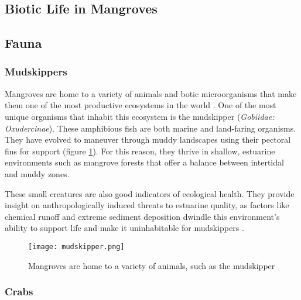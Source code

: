 

\subsection{Biotic Life in Mangroves}

\subsection{Fauna} 

\subsubsection{Mudskippers}

Mangroves are home to a variety of animals and botic microorganisms that make them one of the most productive ecosystems in the world \citep{kristensen1991benthic}. One of the most unique organisms that inhabit this ecosystem is the mudskipper (\textit{Gobiidae: Oxudercinae}). These amphibious fish are both marine and land-faring organisms. They have evolved to maneuver through muddy landscapes using their pectoral fins for support  (figure \ref{fig:mudskipper}). For this reason, they thrive in shallow, estuarine environments such as mangrove forests that offer a balance between intertidal and muddy zones. 
	
These small creatures are also good indicators of ecological health. They provide insight on anthropologically induced threats to estuarine quality, as factors like chemical runoff and extreme sediment deposition dwindle this environment's ability to support life and make it uninhabitable for mudskippers \citep{polgar2009species}. 

  
  \begin{figure}[!h]
    \centering
    \texttt{[image: mudskipper.png]}
    \caption {Mangroves are home to a variety of animals, such as the mudskipper}
    \label{fig:mudskipper}
\end{figure}


\subsubsection{Crabs}

